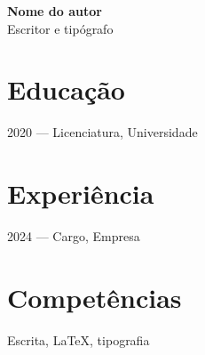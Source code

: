 \documentclass[11pt]{article}
\begin{document}
{\Large\bfseries Nome do autor}\\[4pt]
{\large Escritor e tipógrafo}

\vspace{8pt}

\section*{Educação}
2020 — Licenciatura, Universidade

\section*{Experiência}
2024 — Cargo, Empresa

\section*{Competências}
Escrita, LaTeX, tipografia
\end{document}
